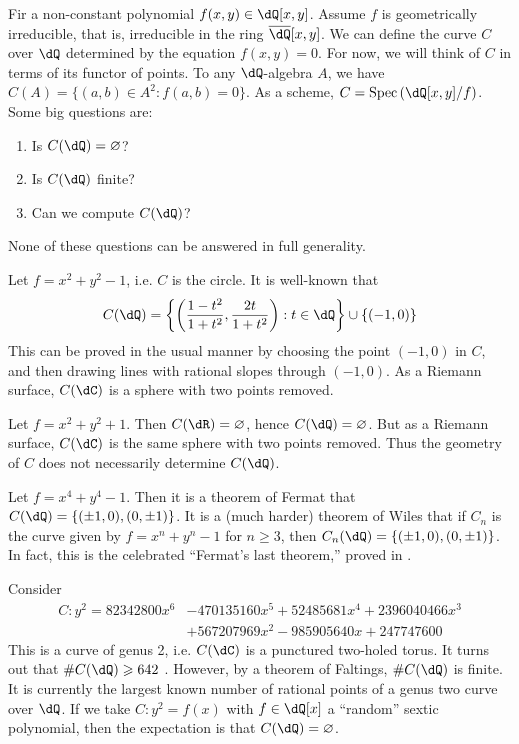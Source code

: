 \documentclass{article}
\begin{document}
Fir a non-constant polynomial $f(x,y)\in\dQ[x,y]$. Assume $f$ is 
geometrically irreducible, that is, irreducible in the ring 
$\overline{\dQ}[x,y]$. We can define the curve $C$ over $\dQ$ determined by the 
equation $f(x,y)=0$. For now, we will think of $C$ in terms of its functor of 
points. To any $\dQ$-algebra $A$, we have $C(A)=\{(a,b)\in A^2:f(a,b)=0\}$. 
As a scheme, $C=\spec\left(\dQ[x,y]/f\right)$. Some big questions are:
\begin{enumerate}
  \item Is $C(\dQ)=\varnothing$?
  \item Is $C(\dQ)$ finite?
  \item Can we compute $C(\dQ)$?
\end{enumerate}
None of these questions can be answered in full generality. 

\begin{example}
Let $f=x^2+y^2-1$, i.e. $C$ is the circle. It is well-known that 
\[
  C(\dQ)=\left\{\left(\frac{1-t^2}{1+t^2},\frac{2t}{1+t^2}\right):t\in\dQ\right\}\cup \{(-1,0)\}
\]
This can be proved in the usual manner by choosing the point $(-1,0)$ in $C$, 
and then drawing lines with rational slopes through $(-1,0)$. As a Riemann 
surface, $C(\dC)$ is a sphere with two points removed. 
\end{example}

\begin{example}
Let $f=x^2+y^2+1$. Then $C(\dR)=\varnothing$, hence $C(\dQ)=\varnothing$. But 
as a Riemann surface, $C(\dC)$ is the same sphere with two points removed. Thus 
the geometry of $C$ does not necessarily determine $C(\dQ)$. 
\end{example}

\begin{example}
Let $f=x^4+y^4-1$. Then it is a theorem of Fermat that 
$C(\dQ)=\{(\pm 1,0),(0,\pm 1)\}$. It is a (much harder) theorem of Wiles that if 
$C_n$ is the curve given by $f=x^n+y^n-1$ for $n\geqslant 3$, then 
$C_n(\dQ)=\{(\pm 1,0),(0,\pm 1)\}$. In fact, this is the celebrated 
``Fermat's last theorem,'' proved in \cite{wi95}. 
\end{example}

\begin{example}[Stoll]
Consider 
\begin{align*}
  C : y^2 = 82342800 x^6 &- 470135160 x^5 + 52485681 x^4 + 2396040466 x^3 \\
    &+ 567207969 x^2 - 985905640 x + 247747600
\end{align*}
This is a curve of genus 2, i.e. $C(\dC)$ is a punctured two-holed 
torus. It turns out that $\# C(\dQ)\geqslant 642$ \cite[\S 6]{st09}. 
However, by a theorem of Faltings, $\# C(\dQ)$ is finite. It is 
currently the largest known number of rational points of a genus two curve 
over $\dQ$. If we take $C:y^2=f(x)$ with $f\in\dQ[x]$ a 
``random'' sextic polynomial, then the expectation is that 
$C(\dQ)=\varnothing$. 
\end{example}
\end{document}
